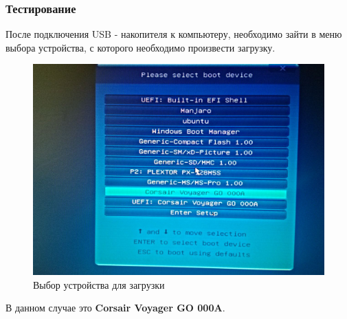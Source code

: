 \subsubsection{Тестирование}
После подключения USB - накопителя к компьютеру, необходимо зайти в меню выбора устройства, с которого необходимо произвести загрузку.
\begin{figure}[H]
  \centering
  \includegraphics[width=.8\textwidth]{img/p3/testing/1}
  \caption{Выбор устройства для загрузки}
\end{figure}
В данном случае это \textbf{Corsair Voyager GO 000A}.

